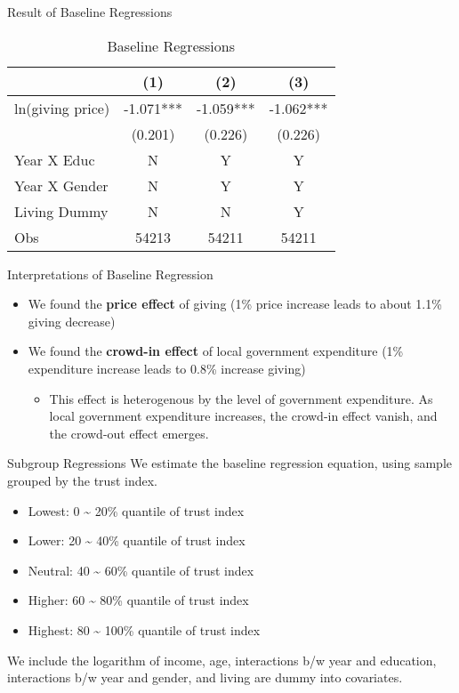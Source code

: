 \documentclass[
  ignorenonframetext,
]{beamer}
\providecommand{\tightlist}{%
  \setlength{\itemsep}{0pt}\setlength{\parskip}{0pt}}
\begin{document}
\begin{frame}{Result of Baseline Regressions}
\protect\hypertarget{result-of-baseline-regressions}{}
\begin{table}

\caption{\label{tab:kableTabBaseReg}Baseline Regressions}
\centering
\begin{tabular}[t]{lccc}
\toprule
 & (1) & (2) & (3)\\
\midrule
ln(giving price) & -1.071*** & -1.059*** & -1.062***\\
 & (0.201) & (0.226) & (0.226)\\
Year X Educ & N & Y & Y\\
Year X Gender & N & Y & Y\\
Living Dummy & N & N & Y\\
Obs & 54213 & 54211 & 54211\\
\bottomrule
\end{tabular}
\end{table}
\end{frame}

\begin{frame}{Interpretations of Baseline Regression}
\protect\hypertarget{interpretations-of-baseline-regression}{}
\begin{itemize}
\tightlist
\item
  We found the \textbf{price effect} of giving (1\% price increase leads
  to about 1.1\% giving decrease)
\item
  We found the \textbf{crowd-in effect} of local government expenditure
  (1\% expenditure increase leads to 0.8\% increase giving)

  \begin{itemize}
  \tightlist
  \item
    This effect is heterogenous by the level of government expenditure.
    As local government expenditure increases, the crowd-in effect
    vanish, and the crowd-out effect emerges.
  \end{itemize}
\end{itemize}
\end{frame}

\begin{frame}{Subgroup Regressions}
\protect\hypertarget{subgroup-regressions}{}
We estimate the baseline regression equation, using sample grouped by
the trust index.

\begin{itemize}
\tightlist
\item
  Lowest: 0 \textasciitilde{} 20\% quantile of trust index
\item
  Lower: 20 \textasciitilde{} 40\% quantile of trust index
\item
  Neutral: 40 \textasciitilde{} 60\% quantile of trust index
\item
  Higher: 60 \textasciitilde{} 80\% quantile of trust index
\item
  Highest: 80 \textasciitilde{} 100\% quantile of trust index
\end{itemize}

We include the logarithm of income, age, interactions b/w year and
education, interactions b/w year and gender, and living are dummy into
covariates.
\end{frame}
\end{document}
